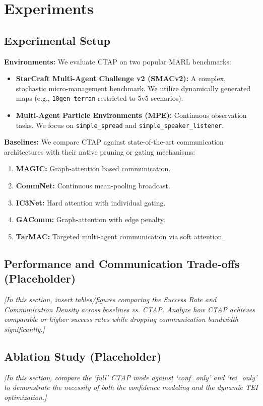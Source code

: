 \documentclass{article}
\begin{document}
\section{Experiments}
\subsection{Experimental Setup}
\textbf{Environments:}
We evaluate CTAP on two popular MARL benchmarks:
\begin{itemize}
    \item \textbf{StarCraft Multi-Agent Challenge v2 (SMACv2):} A complex, stochastic micro-management benchmark. We utilize dynamically generated maps (e.g., \texttt{10gen\_terran} restricted to 5v5 scenarios).
    \item \textbf{Multi-Agent Particle Environments (MPE):} Continuous observation tasks. We focus on \texttt{simple\_spread} and \texttt{simple\_speaker\_listener}.
\end{itemize}

\textbf{Baselines:}
We compare CTAP against state-of-the-art communication architectures with their native pruning or gating mechanisms:
\begin{enumerate}
    \item \textbf{MAGIC:} Graph-attention based communication.
    \item \textbf{CommNet:} Continuous mean-pooling broadcast.
    \item \textbf{IC3Net:} Hard attention with individual gating.
    \item \textbf{GAComm:} Graph-attention with edge penalty.
    \item \textbf{TarMAC:} Targeted multi-agent communication via soft attention.
\end{enumerate}

\subsection{Performance and Communication Trade-offs (Placeholder)}
\textit{[In this section, insert tables/figures comparing the Success Rate and Communication Density across baselines vs. CTAP. Analyze how CTAP achieves comparable or higher success rates while dropping communication bandwidth significantly.]}

\subsection{Ablation Study (Placeholder)}
\textit{[In this section, compare the `full' CTAP mode against `conf\_only' and `tei\_only' to demonstrate the necessity of both the confidence modeling and the dynamic TEI optimization.]}
\end{document}

